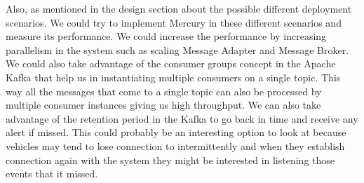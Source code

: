 Also, as mentioned in the design section about the possible different
deployment scenarios. We could try to implement Mercury in these
different scenarios and measure its performance. We could increase the
performance by increasing parallelism in the system such as scaling
Message Adapter and Message Broker. We could also take advantage of
the consumer groups concept in the Apache Kafka that help us in
instantiating multiple consumers on a single topic. This way all the
messages that come to a single topic can also be processed by multiple
consumer instances giving us high throughput. We can also take
advantage of the retention period in the Kafka to go back in time and
receive any alert if missed. This could probably be an interesting
option to look at because vehicles may tend to lose connection to
intermittently and when they establish connection again with the
system they might be interested in listening those events that it
missed.


